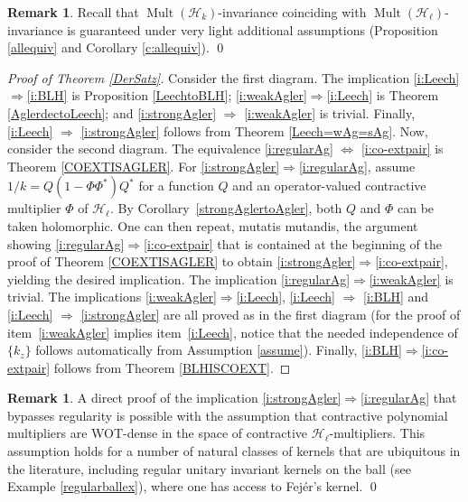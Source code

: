 \documentclass[a4paper,reqno,index]{amsart}
\numberwithin{equation}{section}
\newcommand{\Mult}{\operatorname{Mult}}
\theoremstyle{definition}
\newtheorem{remark}[theorem]{Remark}
\begin{document}
\begin{remark}
Recall that  $\Mult(\mathcal{H}_k)$-invariance coinciding with  $\Mult(\mathcal{H}_{\ell})$-invariance is guaranteed under very light additional assumptions (Proposition \ref{allequiv} and Corollary \ref{c:allequiv}).
\qed\end{remark}

\begin{proof}[Proof of Theorem \ref{DerSatz}]
Consider the first diagram. The implication \ref{i:Leech}$\Rightarrow$\ref{i:BLH} is Proposition \ref{LeechtoBLH};   \ref{i:weakAgler}$\Rightarrow$\ref{i:Leech} is Theorem \ref{AglerdectoLeech}; and  \ref{i:strongAgler} $\Rightarrow$ \ref{i:weakAgler} is trivial. Finally, \ref{i:Leech} $\Rightarrow$ \ref{i:strongAgler} follows from Theorem \ref{Leech=wAg=sAg}. 
Now, consider the second diagram. The equivalence \ref{i:regularAg} $\Leftrightarrow$ \ref{i:co-extpair} is Theorem \ref{COEXTISAGLER}. For \ref{i:strongAgler}$\Rightarrow$\ref{i:regularAg}, assume $1/k=Q(1-\Phi\Phi^*)Q^*$ for a function $Q$ and an operator-valued contractive multiplier $\Phi$ of $\mathcal{H}_{\ell}$. By Corollary~\ref{strongAglertoAgler}, both $Q$ and $\Phi$ can be taken holomorphic. One can then repeat, mutatis mutandis, the argument showing \ref{i:regularAg}$\Rightarrow$\ref{i:co-extpair} that is contained at the beginning of the proof of Theorem \ref{COEXTISAGLER} to obtain 
\ref{i:strongAgler}$\Rightarrow$\ref{i:co-extpair}, yielding the desired implication. The implication \ref{i:regularAg}$\Rightarrow$\ref{i:weakAgler} is trivial. The implications 
 \ref{i:weakAgler}$\Rightarrow$\ref{i:Leech}, \ref{i:Leech} $\Rightarrow$ \ref{i:BLH}
and \ref{i:Leech} $\Rightarrow$ \ref{i:strongAgler} are all proved as in the first diagram (for the proof of item~\ref{i:weakAgler} implies item~\ref{i:Leech}, notice that the needed independence of  $\{k_z\}$ follows automatically from Assumption \ref{assume}). Finally, \ref{i:BLH}$\Rightarrow$\ref{i:co-extpair} follows from Theorem \ref{BLHISCOEXT}. 
\end{proof}


\begin{remark}\rm
A direct proof of the implication \ref{i:strongAgler}$\Rightarrow$\ref{i:regularAg}
 that bypasses  regularity is possible
 with the assumption that contractive polynomial multipliers are WOT-dense in the space of contractive $\mathcal{H}_{\ell}$-multipliers. This assumption
 holds for a number of natural classes of kernels that are ubiquitous in the literature, including  regular unitary invariant kernels on the ball
  (see Example \ref{regularballex}), where one has access to Fejér's kernel. 
\qed
\end{remark}
 
\end{document}
